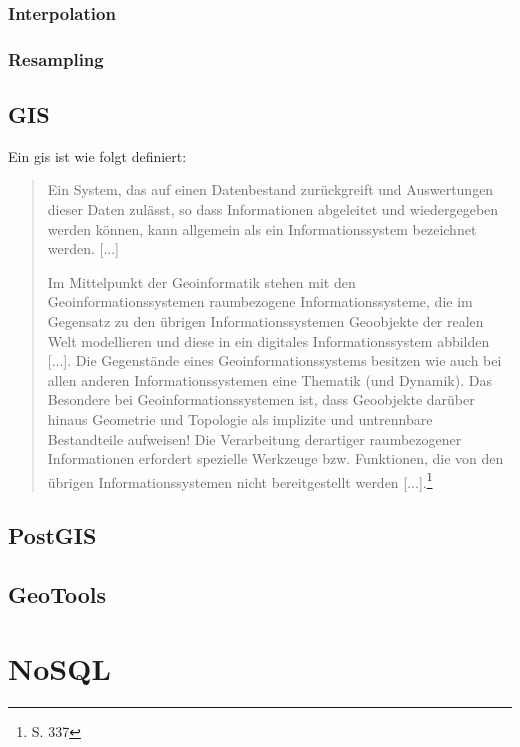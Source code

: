 \subsubsection{Interpolation}

\subsubsection{Resampling}


\subsection{GIS}
\label{grundlagen:gis}

Ein \Gls{gis} ist wie folgt definiert:
\begin{quote}
Ein System,  das  auf einen Datenbestand zurückgreift und Auswertungen dieser Daten zulässt,  so dass Informationen abgeleitet und wiedergegeben werden können,  kann  allgemein  als  ein  Informationssystem  bezeichnet  werden. [...]

Im Mittelpunkt  der  Geoinformatik  stehen  mit den  Geoinformationssystemen raumbezogene Informationssysteme, die im Gegensatz zu den übrigen Informationssystemen Geoobjekte  der realen Welt modellieren und diese in ein digitales Informationssystem abbilden [...]. Die Gegenstände eines Geoinformationssystems  besitzen  wie  auch  bei  allen  anderen  Informationssystemen  eine 
Thematik (und Dynamik). Das Besondere bei Geoinformationssystemen ist, dass Geoobjekte darüber hinaus Geometrie und Topologie als implizite und untrennbare Bestandteile aufweisen!  Die Verarbeitung derartiger raumbezogener Informationen erfordert spezielle Werkzeuge bzw. Funktionen, die von den übrigen Informationssystemen nicht bereitgestellt werden [...].\footnote{\cite{book:gi-theopluspraxis3} S. 337}
\end{quote}

\subsection{PostGIS}

\subsection{GeoTools}



\section{NoSQL}

